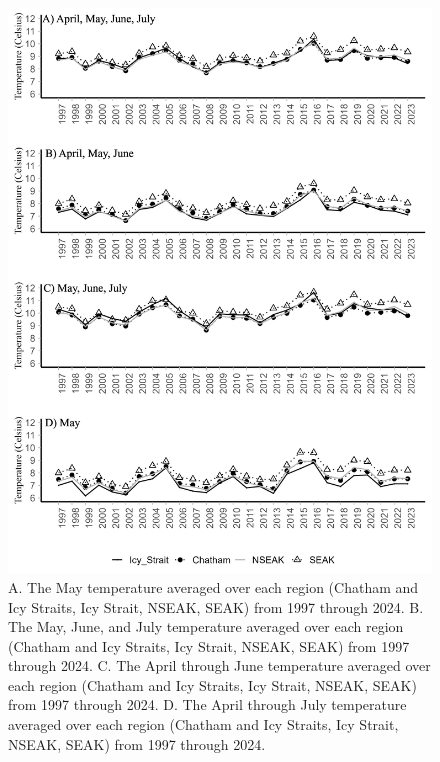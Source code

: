 \documentclass[
]{article}
\begin{document}
\begin{figure}
\centering
\includegraphics{../../2024_forecast/results/temperature_data/monthly_temp_regions.png}
\caption{A. The May temperature averaged over each region (Chatham and
Icy Straits, Icy Strait, NSEAK, SEAK) from 1997 through 2024. B. The
May, June, and July temperature averaged over each region (Chatham and
Icy Straits, Icy Strait, NSEAK, SEAK) from 1997 through 2024. C. The
April through June temperature averaged over each region (Chatham and
Icy Straits, Icy Strait, NSEAK, SEAK) from 1997 through 2024. D. The
April through July temperature averaged over each region (Chatham and
Icy Straits, Icy Strait, NSEAK, SEAK) from 1997 through 2024.}
\end{figure}
\end{document}
